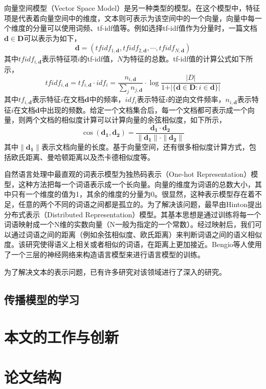 向量空间模型（Vector Space Model）是另一种类型的模型。在这个模型中，特征项是代表着向量空间中的维度，文本则可表示为该空间中的一个向量，向量中每一个维度的分量可以使用词频、tf-idf值等。例如选择tf-idf值作为分量时，一篇文档$\mathbf{d} \in \mathbf{D}$可以表示为如下，
\begin{equation}
\label{eq:documentVec}
	\mathbf{d} = \left({tfidf}_{1,\mathbf{d}}, {tfidf}_{2,\mathbf{d}}, \cdots, {tfidf}_{N,\mathbf{d}}\right)
\end{equation}
其中${tfidf}_{i,\mathbf{d}}$表示特征项$i$的tf-idf值，$N$为特征的总数。tf-idf值的计算公式如下所示，
\begin{equation}
\label{eq:tfidfFormula}
	{tfidf}_{i,\mathbf{d}} = {tf}_{i,\mathbf{d}} \cdot {idf}_i = \frac{n_{i,\mathbf{d}}}{\sum_j n_{j,\mathbf{d}}} \cdot \log{\frac{|D|}{1 + \vert \{\mathbf{d} \in \mathbf{D} : i \in \mathbf{d}\}\vert}} 
\end{equation}
其中${tf}_{i,\mathbf{d}}$表示特征$i$在文档$\mathbf{d}$中的频率，${idf}_i$表示特征$i$的逆向文件频率，$n_{i,\mathbf{d}}$表示特征$i$在文档$\mathbf{d}$中出现的频数。给定一个文档集合后，每一个文档都可表示成一个向量，则两个文档的相似度计算可以计算向量的余弦相似度，如下所示，
\begin{equation}
\label{eq:cosSim}
	\cos \left( \mathbf{d_1}, \mathbf{d_2} \right) = \frac{\mathbf{d_1} \cdot \mathbf{d_2}}{\| \mathbf{d_1} \| \cdot \| \mathbf{d_2} \|}
\end{equation}
其中$\| \mathbf{d_1} \|$表示文档向量的长度。基于向量空间，还有很多相似度计算方式，包括欧氏距离、曼哈顿距离以及杰卡德相似度等。

自然语言处理中最直观的词表示模型为独热码表示（One-hot Representation）模型，这种方法把每一个词语表示成一个长向量。向量的维度为词语的总数大小，其中只有一个维度的值为1，其余的维度的分量为0。很显然，这种表示模型存在着不足，任意的两个不同的词语之间都是孤立的。为了解决该问题，最早由Hinton提出分布式表示（Distributed Representation）模型。其基本思想是通过训练将每一个词语映射成一个N维的实数向量（N一般为指定的一个常数）。经过映射后，我们可以通过词语之间的距离（例如余弦相似度、欧氏距离）来判断词语之间的语义相似度。该研究使得语义上相关或者相似的词语，在距离上更加接近。Bengio等人使用了一个三层的神经网络来构造语言模型来进行语言模型的训练。

为了解决文本的表示问题，已有许多研究对该领域进行了深入的研究。
\subsection{传播模型的学习}
\label{subsec1:diffusionModel}

\section{本文的工作与创新}
\label{sec1:inovation}

\section{论文结构}
\label{sec1:paperStructure}